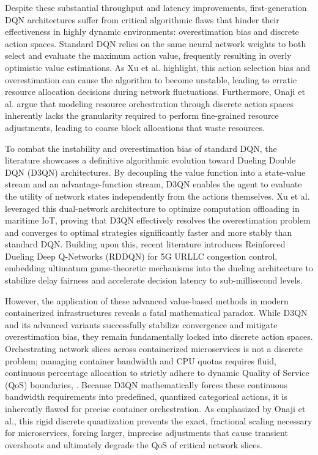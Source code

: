 Despite these substantial throughput and latency improvements, first-generation DQN architectures suffer from critical algorithmic flaws that hinder their effectiveness in highly dynamic environments: overestimation bias and discrete action spaces. Standard DQN relies on the same neural network weights to both select and evaluate the maximum action value, frequently resulting in overly optimistic value estimations. As Xu et al. highlight, this action selection bias and overestimation can cause the algorithm to become unstable, leading to erratic resource allocation decisions during network fluctuations\cite{b13}. Furthermore, Onaji et al. argue that modeling resource orchestration through discrete action spaces inherently lacks the granularity required to perform fine-grained resource adjustments, leading to coarse block allocations that waste resources\cite{b6}.

To combat the instability and overestimation bias of standard DQN, the literature showcases a definitive algorithmic evolution toward Dueling Double DQN (D3QN) architectures. By decoupling the value function into a state-value stream and an advantage-function stream, D3QN enables the agent to evaluate the utility of network states independently from the actions themselves. Xu et al. leveraged this dual-network architecture to optimize computation offloading in maritime IoT, proving that D3QN effectively resolves the overestimation problem and converges to optimal strategies significantly faster and more stably than standard DQN\cite{b13}. Building upon this, recent literature introduces Reinforced Dueling Deep Q-Networks (RDDQN) for 5G URLLC congestion control, embedding ultimatum game-theoretic mechanisms into the dueling architecture to stabilize delay fairness and accelerate decision latency to sub-millisecond levels\cite{b16}.

However, the application of these advanced value-based methods in modern containerized infrastructures reveals a fatal mathematical paradox. While D3QN and its advanced variants successfully stabilize convergence and mitigate overestimation bias, they remain fundamentally locked into discrete action spaces\cite{b13}. Orchestrating network slices across containerized microservices is not a discrete problem; managing container bandwidth and CPU quotas requires fluid, continuous percentage allocation to strictly adhere to dynamic Quality of Service (QoS) boundaries\cite{b6}, \cite{b39}. Because D3QN mathematically forces these continuous bandwidth requirements into predefined, quantized categorical actions, it is inherently flawed for precise container orchestration\cite{b6}. As emphasized by Onaji et al., this rigid discrete quantization prevents the exact, fractional scaling necessary for microservices, forcing larger, imprecise adjustments that cause transient overshoots and ultimately degrade the QoS of critical network slices\cite{b6}.

